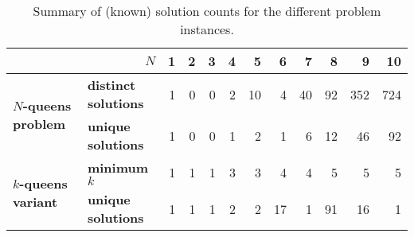 \begin{table}[t]
\centering
\begin{tabular}{@{}l@{\enspace}l|rrrrrrrrrr}
\hline
\multicolumn{2}{r|}{$N$}
 & \bf 1 & \bf 2 & \bf 3 & \bf 4 & \bf 5 & \bf 6 &
\bf 7 & \bf 8 & \bf 9 & \bf 10\\
\hline
\multirow{2}{*}{\bf $N$-queens problem}
 & \bf distinct solutions & 1 & 0 & 0 & 2 & 10 & 4 & 40 & 92 & 352 & 724\\
 & \bf unique solutions & 1 & 0 & 0 & 1 & 2 & 1 & 6 & 12 & 46 & 92\\
\hline
\multirow{2}{*}{\bf $k$-queens variant}
 & \bf minimum $k$ & 1 & 1 & 1 & 3 & 3 & 4 & 4 & 5 & 5 & 5\\
 & \bf unique solutions & 1 & 1 & 1 & 2 & 2 & 17 & 1 & 91 & 16 & 1\\
\hline
\end{tabular}
\caption{Summary of (known) solution counts for the different problem
instances.}
\end{table}
